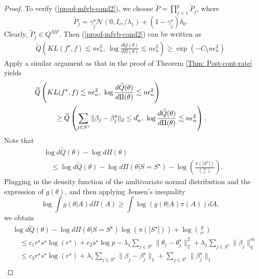 \documentclass[pdftex, noinfoline, letter]{imsart}
\theoremstyle{plain}
\begin{document}
\begin{proof}
To verify (\ref{proof-mfvb-cond2}),
we choose $\widetilde{P} = \prod_{j=1}^p \widetilde{P}_j$, where $$\widetilde{P}_j = \gamma_j^\star \mathcal{N}(0, I_{r^\star}/ \lambda_1) + (1-\gamma_j^\star) \delta_0.$$
Clearly, $\widetilde{P}_j \in Q^{MF}$. 
Then (\ref{proof-mfvb-cond2}) can be written as
\begin{align}
\label{proof-mfvb-cond3}
    \widetilde{Q}
    \left(
        KL(f^\star, f) \lesssim n\epsilon_n^2, \
        \log \frac{d\widetilde{Q}(\theta)}{d\Pi(\theta)} \lesssim n\epsilon_n^2
    \right) \geq \exp(-C_5 n \epsilon_n^2)
\end{align}
Apply a similar argument as that in the proof of Theorem \ref{Thm: Post-cont-rate} yields
\begin{align}
\label{mf-posterior-1}
   &\hspace{-1cm} \widetilde{Q}
    \left(
        KL(f^\star, f) \lesssim n\epsilon_n^2, \
        \log \frac{d\widetilde{Q}(\theta)}{d\Pi(\theta)}
        \lesssim n\epsilon_n^2
    \right)\\
    &\geq 
    \widetilde{Q}
        \left(
        \sum_{j \in S^\star} \|\beta_j - \beta_j^\star\|_2 \leq d_n', \
        \log \frac{d\widetilde{Q}(\theta)}{d\Pi(\theta)}
        \lesssim n\epsilon_n^2
    \right).
\end{align}
Note that
\begin{align}
\label{bound-1}
& \log d\widetilde{Q}(\theta) - \log d\Pi(\theta) \nonumber \\
& \quad \leq \log d\widetilde{Q}(\theta) - \log d\Pi(\theta|S = S^\star) -
\log \left(\frac{\pi(|S^\star|)}{{p \choose s^\star}}\right).
\end{align}
Plugging in the density function of the multivariate normal distribution and the expression of $g(\theta)$, and then applying Jensen's inequality
$$\log \int g(\theta|A) d\Pi(A) \geq \int \log (g(\theta|A) \pi(A)) dA,$$ we obtain 
\begin{align}
    & \log d\widetilde{Q}(\theta) - \log d\Pi(\theta|S = S^\star) 
    \log (\pi(|S^\star|)) + \log {p \choose s^\star}
    \nonumber \\
    & \quad \leq c_1 r^\star s^\star \log (r^\star)  + c_2s^\star \log p - \lambda_1\sum_{j\in S^\star} \|\theta_j - \theta_j^\star\|_2^2 + \lambda_1 \sum_{j \in S^\star} \|\beta_j \|_q^m \nonumber \\
    & \quad \leq 
    c_3 r^\star s^\star \log (r^\star) + \lambda_1 \sum_{j \in S^\star} \|\beta_j - \beta_j^\star\|_1 +
    \sum_{j \in S^\star} \|\beta_j^\star\|_1\nonumber\\

\end{align}
\end{proof}
\end{document}
